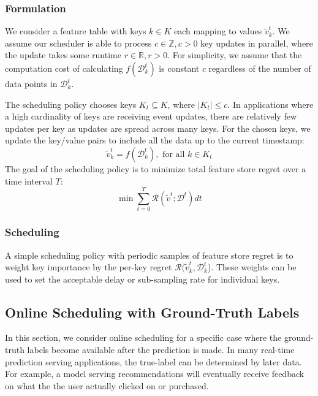 \subsubsection{Formulation}
We consider a feature table with keys $k\in K$ each mapping to values $\tilde{v}_k^t$. We assume our scheduler is able to process $c\in\mathbb{Z}, c > 0$ key updates in parallel, where the update takes some runtime $r\in \mathbb{R}, r > 0$. For simplicity, we assume that the computation cost of calculating $f(\mathcal{D}_k^{t})$ is constant $c$ regardless of the number of data points in $\mathcal{D}_k^{t}$. 

The scheduling policy chooses keys $K_t \subseteq K$, where $|K_t| \le c$. In applications where a high cardinality of keys are receiving event updates, there are relatively few updates per key as updates are spread across many keys. For the chosen keys, we update the key/value pairs to include all the data up to the current timestamp: 
\begin{equation}
    \tilde{v}_k^t = f(\mathcal{D}_k^t), \text{ for all } k\in K_t 
\end{equation}
The goal of the scheduling policy is to minimize total feature store regret over a time interval $T$: 
 \begin{equation}
     \min \sum_{t=0}^T \mathcal{R}(\tilde{v}^t; \mathcal{D}^t) dt
 \end{equation}
\subsubsection{Scheduling} A simple scheduling policy with periodic samples of feature store regret is to weight key importance by the per-key regret $\mathcal{R}(\tilde{v}^t_k, \mathcal{D}^t_k$). These weights can be used to set the acceptable delay or sub-sampling rate for individual keys. 

\subsection{Online Scheduling with Ground-Truth Labels}
In this section, we consider online scheduling for a specific case where the ground-truth labels become available after the prediction is made. In many real-time prediction serving applications, the true-label can be determined by later data. For example, a model serving recommendations will eventually receive feedback on what the the user actually clicked on or purchased. 

